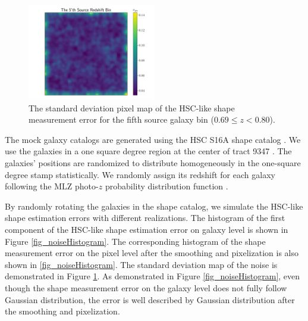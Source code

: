 \begin{figure}
 \centering
 \includegraphics[width=0.5\textwidth]{noise_std_map_pix.pdf}
 \caption{The standard deviation pixel map of the HSC-like shape measurement
     error for the fifth source galaxy bin ($0.69 \leq z < 0.80 $).
        } \label{fig_noistdmap}
\end{figure}

The mock galaxy catalogs are generated using the HSC S16A shape catalog
\citep{HSC1-catalog}.  We use the galaxies in a one square degree region at the
center of tract 9347 \citep{HSC1-data}.  The galaxies' positions are randomized
to distribute homogeneously  in the one-square degree stamp statistically. We
randomly assign its redshift for each galaxy following the MLZ photo-$z$
probability distribution function \citep{HSC1-photoz}.

By randomly rotating the galaxies in the shape catalog, we simulate the
HSC-like shape estimation errors with different realizations.  The histogram of
the first component of the HSC-like shape estimation error on galaxy level is
shown in Figure \ref{fig_noiseHistogram}.  The corresponding histogram of the
shape measurement error on the pixel level after the smoothing and pixelization is
also shown in \ref{fig_noiseHistogram}. The standard deviation map of the
noise is demonstrated in Figure \ref{fig_noistdmap}. As demonstrated in Figure
\ref{fig_noiseHistogram}, even though the shape measurement error on the galaxy
level does not fully follow Gaussian distribution, the error is well described
by Gaussian distribution after the smoothing and pixelization.
